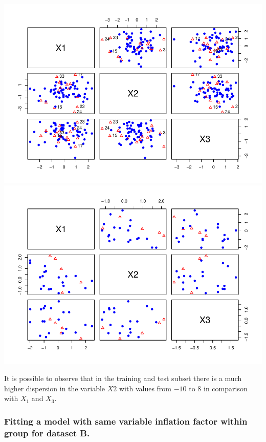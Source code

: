 \documentclass[
]{article}
\begin{document}
\includegraphics{DifferentVarInflationFactors_files/figure-latex/plotB_training-1.pdf}
\includegraphics{DifferentVarInflationFactors_files/figure-latex/plotB_test-1.pdf}

It is possible to observe that in the training and test subset there is
a much higher dispersion in the variable \(X2\) with values from \(-10\)
to \(8\) in comparison with \(X_{1}\) and \(X_{3}\).

\hypertarget{fitting-a-model-with-same-variable-inflation-factor-within-group-for-dataset-b.}{%
\subsubsection{Fitting a model with same variable inflation factor
within group for dataset
B.}\label{fitting-a-model-with-same-variable-inflation-factor-within-group-for-dataset-b.}}
\end{document}
